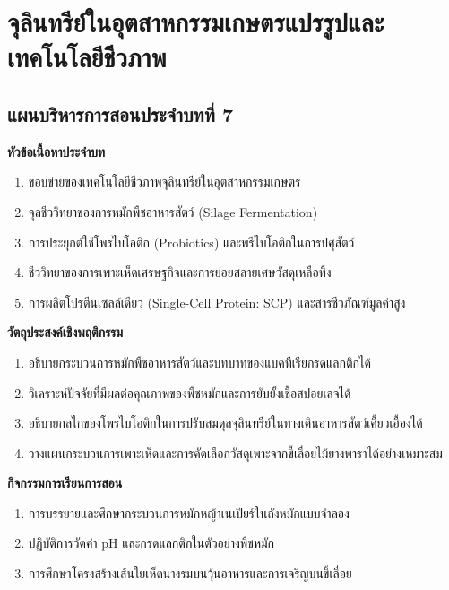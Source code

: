 \chapter{จุลินทรีย์ในอุตสาหกรรมเกษตรแปรรูปและเทคโนโลยีชีวภาพ}
\label{chap:ch07}

\section*{แผนบริหารการสอนประจำบทที่ 7}

\noindent\textbf{หัวข้อเนื้อหาประจำบท}
\begin{enumerate}
    \item ขอบข่ายของเทคโนโลยีชีวภาพจุลินทรีย์ในอุตสาหกรรมเกษตร
    \item จุลชีววิทยาของการหมักพืชอาหารสัตว์ (Silage Fermentation)
    \item การประยุกต์ใช้โพรไบโอติก (Probiotics) และพรีไบโอติกในการปศุสัตว์
    \item ชีววิทยาของการเพาะเห็ดเศรษฐกิจและการย่อยสลายเศษวัสดุเหลือทิ้ง
    \item การผลิตโปรตีนเซลล์เดียว (Single-Cell Protein: SCP) และสารชีวภัณฑ์มูลค่าสูง
\end{enumerate}

\noindent\textbf{วัตถุประสงค์เชิงพฤติกรรม}
\begin{enumerate}
    \item อธิบายกระบวนการหมักพืชอาหารสัตว์และบทบาทของแบคทีเรียกรดแลกติกได้
    \item วิเคราะห์ปัจจัยที่มีผลต่อคุณภาพของพืชหมักและการยับยั้งเชื้อสปอยเลจได้
    \item อธิบายกลไกของโพรไบโอติกในการปรับสมดุลจุลินทรีย์ในทางเดินอาหารสัตว์เคี้ยวเอื้องได้
    \item วางแผนกระบวนการเพาะเห็ดและการคัดเลือกวัสดุเพาะจากขี้เลื่อยไม้ยางพาราได้อย่างเหมาะสม
\end{enumerate}

\noindent\textbf{กิจกรรมการเรียนการสอน}
\begin{enumerate}
    \item การบรรยายและศึกษากระบวนการหมักหญ้าเนเปียร์ในถังหมักแบบจำลอง
    \item ปฏิบัติการวัดค่า pH และกรดแลกติกในตัวอย่างพืชหมัก
    \item การศึกษาโครงสร้างเส้นใยเห็ดนางรมบนวุ้นอาหารและการเจริญบนขี้เลื่อย
\end{enumerate}

